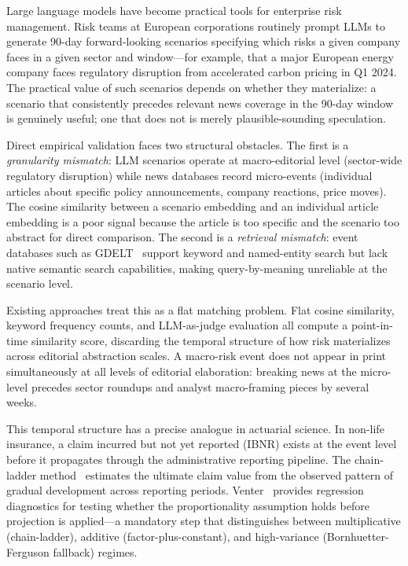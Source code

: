 \documentclass[11pt,letterpaper]{article}
\begin{document}
Large language models have become practical tools for enterprise risk management. Risk teams at European corporations routinely prompt LLMs to generate 90-day forward-looking scenarios specifying which risks a given company faces in a given sector and window---for example, that a major European energy company faces regulatory disruption from accelerated carbon pricing in Q1 2024. The practical value of such scenarios depends on whether they materialize: a scenario that consistently precedes relevant news coverage in the 90-day window is genuinely useful; one that does not is merely plausible-sounding speculation.

Direct empirical validation faces two structural obstacles. The first is a \emph{granularity mismatch}: LLM scenarios operate at macro-editorial level (sector-wide regulatory disruption) while news databases record micro-events (individual articles about specific policy announcements, company reactions, price moves). The cosine similarity between a scenario embedding and an individual article embedding is a poor signal because the article is too specific and the scenario too abstract for direct comparison. The second is a \emph{retrieval mismatch}: event databases such as GDELT~\citep{Leetaru2013} support keyword and named-entity search but lack native semantic search capabilities, making query-by-meaning unreliable at the scenario level.

Existing approaches treat this as a flat matching problem. Flat cosine similarity, keyword frequency counts, and LLM-as-judge evaluation all compute a point-in-time similarity score, discarding the temporal structure of how risk materializes across editorial abstraction scales. A macro-risk event does not appear in print simultaneously at all levels of editorial elaboration: breaking news at the micro-level precedes sector roundups and analyst macro-framing pieces by several weeks.

This temporal structure has a precise analogue in actuarial science. In non-life insurance, a claim incurred but not yet reported (IBNR) exists at the event level before it propagates through the administrative reporting pipeline. The chain-ladder method~\citep{Mack1993} estimates the ultimate claim value from the observed pattern of gradual development across reporting periods. Venter~\citep{Venter1998} provides regression diagnostics for testing whether the proportionality assumption holds before projection is applied---a mandatory step that distinguishes between multiplicative (chain-ladder), additive (factor-plus-constant), and high-variance (Bornhuetter-Ferguson fallback) regimes.
\end{document}

